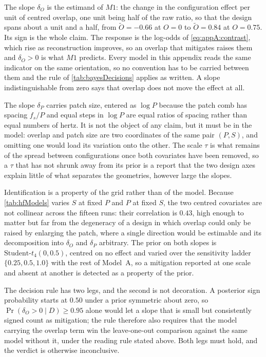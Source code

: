 The slope $\delta_O$ is the estimand of $M1$: the change in the configuration effect per unit of centred overlap, one unit being half of the raw ratio, so that the design spans about a unit and a half, from $\widetilde O=-0.66$ at $O=0$ to $\widetilde O=0.84$ at $O=0.75$. Its sign is the whole claim. The response is the log-odds of \autoref{eq:appA:contrast}, which rise as reconstruction improves, so an overlap that mitigates raises them and $\delta_O>0$ is what $M1$ predicts. Every model in this appendix reads the same indicator on the same orientation, so no convention has to be carried between them and the rule of \autoref{tab:bayesDecisions} applies as written. A slope indistinguishable from zero says that overlap does not move the effect at all.

The slope $\delta_P$ carries patch size, entered as $\log P$ because the patch comb has spacing $f_s/P$ and equal steps in $\log P$ are equal ratios of spacing rather than equal numbers of hertz. It is not the object of any claim, but it must be in the model: overlap and patch size are two coordinates of the same pair $(P,S)$, and omitting one would load its variation onto the other. The scale $\tau$ is what remains of the spread between configurations once both covariates have been removed, so a $\tau$ that has not shrunk away from its prior is a report that the two design axes explain little of what separates the geometries, however large the slopes.

Identification is a property of the grid rather than of the model. Because \autoref{tab:hfModels} varies $S$ at fixed $P$ and $P$ at fixed $S$, the two centred covariates are not collinear across the fifteen runs: their correlation is $0.43$, high enough to matter but far from the degeneracy of a design in which overlap could only be raised by enlarging the patch, where a single direction would be estimable and its decomposition into $\delta_O$ and $\delta_P$ arbitrary. The prior on both slopes is $\text{Student-}t_4(0,0.5)$, centred on no effect and varied over the sensitivity ladder $\{0.25,0.5,1.0\}$ with the rest of Model~A, so a mitigation reported at one scale and absent at another is detected as a property of the prior.

The decision rule has two legs, and the second is not decoration. A posterior sign probability starts at $0.50$ under a prior symmetric about zero, so $\Pr(\delta_O>0\mid D)\ge 0.95$ alone would let a slope that is small but consistently signed count as mitigation; the rule therefore also requires that the model carrying the overlap term win the leave-one-out comparison against the same model without it, under the reading rule stated above. Both legs must hold, and the verdict is otherwise inconclusive.

